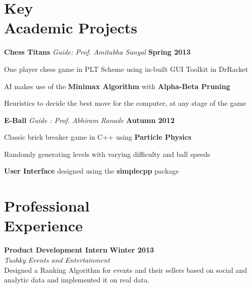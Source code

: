 \documentclass[margin,11pt]{resume}
\begin{document}
\begin{resume}
\vspace{70pt}


\section{\mysidestyle Key \\ Academic Projects}
\textbf{Chess Titans}  \hspace{5em} \textsl{Guide: Prof. Amitabha Sanyal} \hspace{8em} \textbf{Spring 2013}
\vspace{-3.5mm}
\begin{list2}
\item One player chess game in PLT Scheme using in-built GUI Toolkit in DrRacket 
\item AI makes use of the \textbf{Minimax Algorithm} with \textbf{Alpha-Beta Pruning}
\item Heuristics to decide the best move for the computer, at any stage of the game
\end{list2}
\vspace{-2mm}
\textbf{E-Ball}  \hspace{8em} \textsl{Guide : Prof. Abhiram Ranade} \hspace{7em} \textbf{Autumn 2012}
\vspace{-3.5mm}
\begin{list2}
\item Classic brick breaker game in C++ using \textbf{Particle Physics} 
\item Randomly generating levels with varying difficulty and ball speeds 
\item \textbf{User Interface} designed using the \textbf{simplecpp} package
\end{list2}

\section{\mysidestyle Professional \\ Experience}
\textbf{Product Development Intern} \hfill \textbf{Winter 2013}\\
\textsl{Tushky Events and Entertainment}\\
Designed a Ranking Algorithm for events and their sellers based on social and analytic data and implemented it on real data.


\end{resume}
\end{document}
